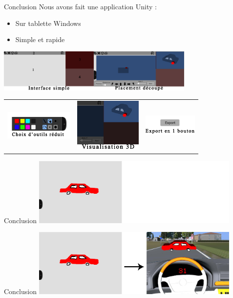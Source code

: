 \documentclass[a4paper,10pt]{beamer}
\begin{document}
	\begin{frame}{Conclusion}
		Nous avons fait une application Unity :
		\begin{itemize}
			\item \pause Sur tablette Windows\pause
			\item Simple et rapide\pause
		\end{itemize}
		\centerline{\includegraphics[height=60pt]{images/conclu/menu.png}\pause\hspace{10 mm}\includegraphics[height=60pt]{images/conclu/place.png}\pause}
		\begin{tabular}{lll}
			\includegraphics[height=40pt]{images/conclu/outils.png} & \pause\includegraphics[height=75pt]{images/conclu/visu.png}\pause & \includegraphics[height=30pt]{images/conclu/export.png}
		\end{tabular}
		 
	\end{frame}
	
	\begin{frame}{Conclusion}
		\includegraphics[height=95pt]{images/conclu/avant.png}
	\end{frame}
	\begin{frame}{Conclusion}
		\includegraphics[height=95pt]{images/conclu/apres.png}
	\end{frame}
\end{document}
